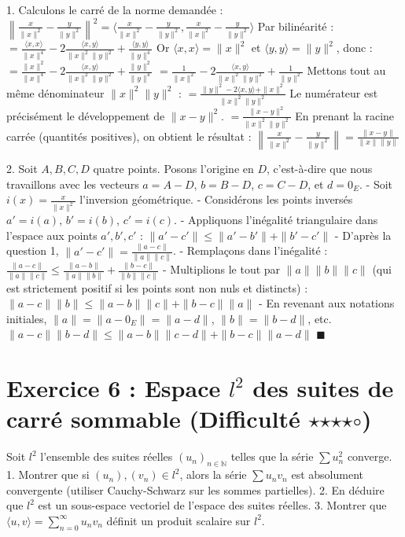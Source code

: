 \documentclass{report}
\begin{document}
1. Calculons le carré de la norme demandée :
   $ \left\| \frac{x}{\|x\|^2} - \frac{y}{\|y\|^2} \right\|^2 = \langle \frac{x}{\|x\|^2} - \frac{y}{\|y\|^2}, \frac{x}{\|x\|^2} - \frac{y}{\|y\|^2} \rangle $
   Par bilinéarité :
   $ = \frac{\langle x, x \rangle}{\|x\|^4} - 2 \frac{\langle x, y \rangle}{\|x\|^2 \|y\|^2} + \frac{\langle y, y \rangle}{\|y\|^4} $
   Or $\langle x, x \rangle = \|x\|^2$ et $\langle y, y \rangle = \|y\|^2$, donc :
   $ = \frac{\|x\|^2}{\|x\|^4} - 2 \frac{\langle x, y \rangle}{\|x\|^2 \|y\|^2} + \frac{\|y\|^2}{\|y\|^4} $
   $ = \frac{1}{\|x\|^2} - 2 \frac{\langle x, y \rangle}{\|x\|^2 \|y\|^2} + \frac{1}{\|y\|^2} $
   Mettons tout au même dénominateur $\|x\|^2 \|y\|^2$ :
   $ = \frac{\|y\|^2 - 2\langle x, y \rangle + \|x\|^2}{\|x\|^2 \|y\|^2} $
   Le numérateur est précisément le développement de $\|x - y\|^2$.
   $ = \frac{\|x - y\|^2}{\|x\|^2 \|y\|^2} $
   En prenant la racine carrée (quantités positives), on obtient le résultat :
   $ \left\| \frac{x}{\|x\|^2} - \frac{y}{\|y\|^2} \right\| = \frac{\|x - y\|}{\|x\| \|y\|} $

2. Soit $A, B, C, D$ quatre points. Posons l'origine en $D$, c'est-à-dire que nous travaillons avec les vecteurs $a = A-D$, $b = B-D$, $c = C-D$, et $d = 0_E$.
   - Soit $i(x) = \frac{x}{\|x\|^2}$ l'inversion géométrique.
   - Considérons les points inversés $a' = i(a)$, $b' = i(b)$, $c' = i(c)$.
   - Appliquons l'inégalité triangulaire dans l'espace aux points $a', b', c'$ :
     $ \|a' - c'\| \le \|a' - b'\| + \|b' - c'\| $
   - D'après la question 1, $\|a' - c'\| = \frac{\|a - c\|}{\|a\| \|c\|}$.
   - Remplaçons dans l'inégalité :
     $ \frac{\|a - c\|}{\|a\| \|c\|} \le \frac{\|a - b\|}{\|a\| \|b\|} + \frac{\|b - c\|}{\|b\| \|c\|} $
   - Multiplions le tout par $\|a\| \|b\| \|c\|$ (qui est strictement positif si les points sont non nuls et distincts) :
     $ \|a - c\| \|b\| \le \|a - b\| \|c\| + \|b - c\| \|a\| $
   - En revenant aux notations initiales, $\|a\| = \|a - 0_E\| = \|a - d\|$, $\|b\| = \|b - d\|$, etc.
     $ \|a - c\| \|b - d\| \le \|a - b\| \|c - d\| + \|b - c\| \|a - d\| $
   $\blacksquare$

\newpage


\chapter*{Exercice 6 : Espace $l^2$ des suites de carré sommable (Difficulté $\star$$\star$$\star$$\star$$\circ$)}

Soit $l^2$ l'ensemble des suites réelles $(u_n)_{n \in \mathbb{N}}$ telles que la série $\sum u_n^2$ converge.
1. Montrer que si $(u_n), (v_n) \in l^2$, alors la série $\sum u_n v_n$ est absolument convergente (utiliser Cauchy-Schwarz sur les sommes partielles).
2. En déduire que $l^2$ est un sous-espace vectoriel de l'espace des suites réelles.
3. Montrer que $\langle u, v \rangle = \sum_{n=0}^\infty u_n v_n$ définit un produit scalaire sur $l^2$.
\end{document}

